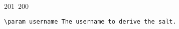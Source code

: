 201~200~\documentclass{article}
\begin{document}
\begin{lstlisting}[language=Python, caption=Hashing and Verifying Passwords with Argon2]
	                                                                                                                                                                                                                                                                                                	                                                                                                                                        	    	                                                                                                	                                                                                                                                                                                                                                                                                                                                	                                                                        	                                                                        	                                                                                                                    \param username The username to derive the salt.
	                                                                                                                                                                                                                                                                                                	                                                                                                                                        	    	                                                                                                	                                                                                                                                                                                                                                                                                                                                	                                                                        	                                                                        	                                                                                                                        \param password The password to derive the key.

\end{lstlisting}
\end{document}
